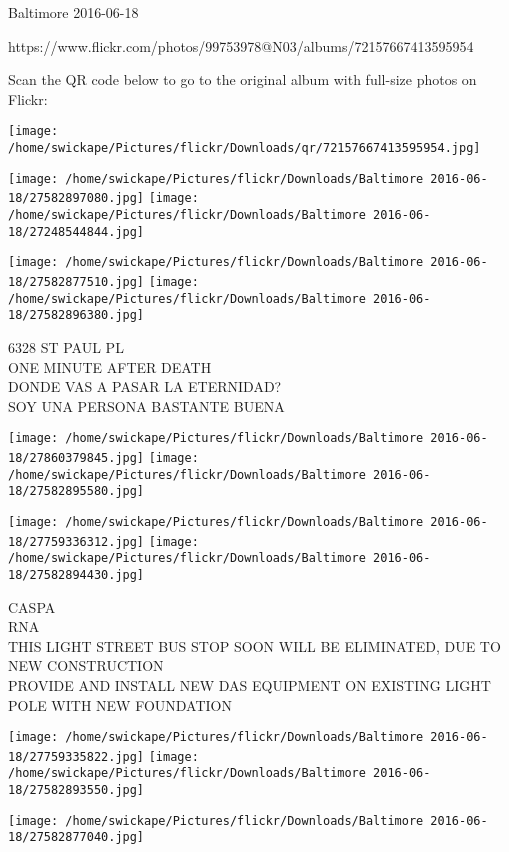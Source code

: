 \documentclass[10pt,letterpaper]{article}
\begin{document}
Baltimore 2016-06-18

https://www.flickr.com/photos/99753978@N03/albums/72157667413595954

Scan the QR code below to go to the original album with full-size photos on Flickr:

\texttt{[image: /home/swickape/Pictures/flickr/Downloads/qr/72157667413595954.jpg]}
\pagebreak

\texttt{[image: /home/swickape/Pictures/flickr/Downloads/Baltimore 2016-06-18/27582897080.jpg]}
\texttt{[image: /home/swickape/Pictures/flickr/Downloads/Baltimore 2016-06-18/27248544844.jpg]}

\texttt{[image: /home/swickape/Pictures/flickr/Downloads/Baltimore 2016-06-18/27582877510.jpg]}
\texttt{[image: /home/swickape/Pictures/flickr/Downloads/Baltimore 2016-06-18/27582896380.jpg]}

6328 ST PAUL PL\\
ONE MINUTE AFTER DEATH\\
DONDE VAS A PASAR LA ETERNIDAD?\\
SOY UNA PERSONA BASTANTE BUENA\\
\pagebreak

\texttt{[image: /home/swickape/Pictures/flickr/Downloads/Baltimore 2016-06-18/27860379845.jpg]}
\texttt{[image: /home/swickape/Pictures/flickr/Downloads/Baltimore 2016-06-18/27582895580.jpg]}

\texttt{[image: /home/swickape/Pictures/flickr/Downloads/Baltimore 2016-06-18/27759336312.jpg]}
\texttt{[image: /home/swickape/Pictures/flickr/Downloads/Baltimore 2016-06-18/27582894430.jpg]}

CASPA\\
RNA\\
THIS LIGHT STREET BUS STOP SOON WILL BE ELIMINATED, DUE TO NEW CONSTRUCTION\\
PROVIDE AND INSTALL NEW DAS EQUIPMENT ON EXISTING LIGHT POLE WITH NEW FOUNDATION\\
\pagebreak

\texttt{[image: /home/swickape/Pictures/flickr/Downloads/Baltimore 2016-06-18/27759335822.jpg]}
\texttt{[image: /home/swickape/Pictures/flickr/Downloads/Baltimore 2016-06-18/27582893550.jpg]}

\texttt{[image: /home/swickape/Pictures/flickr/Downloads/Baltimore 2016-06-18/27582877040.jpg]}
\end{document}
